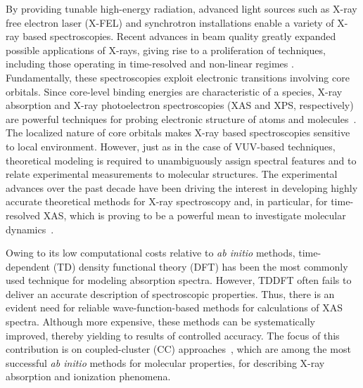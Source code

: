 \documentclass[journal=jctcce,manuscript=article]{achemso}
\begin{document}
By providing tunable high-energy radiation, advanced light sources
such as X-ray free electron laser (X-FEL) and synchrotron installations enable a variety of X-ray based spectroscopies\cite{Lamberti:XRay:2016,Mobilio:XRay:2014,Bergmann:FEL:17}.
Recent advances in beam quality greatly expanded possible applications of X-rays, giving rise to a proliferation of techniques, including those operating in time-resolved and non-linear
regimes \cite{Mobilio:XRay:2014,Lamberti:XRay:2016,Bergmann:FEL:17,Atto:Rev:17,Norman:ChemRev:18}.  
Fundamentally, these spectroscopies exploit electronic transitions involving core orbitals. 
Since core-level binding energies are characteristic of a species, X-ray absorption and
X-ray photoelectron spectroscopies (XAS and XPS, respectively) 
are powerful techniques for probing electronic structure of atoms and molecules~\cite{Stohr1992}.
The localized nature of core orbitals makes X-ray based spectroscopies sensitive to local environment.  
However, just as in the case of VUV-based techniques\cite{Ahmed:ARPC:16},
theoretical modeling is required to unambiguously assign spectral features and to
relate experimental measurements to molecular structures. 
The experimental advances over the past decade have been driving the interest in developing highly accurate theoretical methods for X-ray spectroscopy and, in particular, for time-resolved XAS, which is proving to be a powerful mean to investigate molecular dynamics~\cite{Norman:ChemRev:18,naturecomm,Milne2014,kraus2018}.

Owing to its low computational costs relative to \textit{ab initio} methods, time-dependent (TD) density functional theory (DFT) has been the most commonly used technique for modeling absorption spectra\cite{Besley:CoreDFTPersp:10}.
However, TDDFT often fails to deliver an accurate description of spectroscopic properties. Thus, there is an evident need for reliable wave-function-based methods for calculations of XAS spectra. Although more expensive, these methods can be systematically improved, thereby yielding to
results of controlled accuracy\cite{OlsenText}. The focus of this contribution is on coupled-cluster (CC)
approaches~\cite{koch1990,Stanton:93:EOMCC,Christiansen_IJQC,krylov_eom_2008,WF_Properties_Review,CC_EOMCC_Bartlett,Christiansen2006,Christiansen:EOMRev:11},
which are among the most successful \textit{ab initio} methods for molecular properties, 
for describing X-ray absorption and ionization phenomena\cite{coriani2012jctc,Peng2015,coriani2012pra,coriani2015jcp,naturecomm}.
\end{document}
